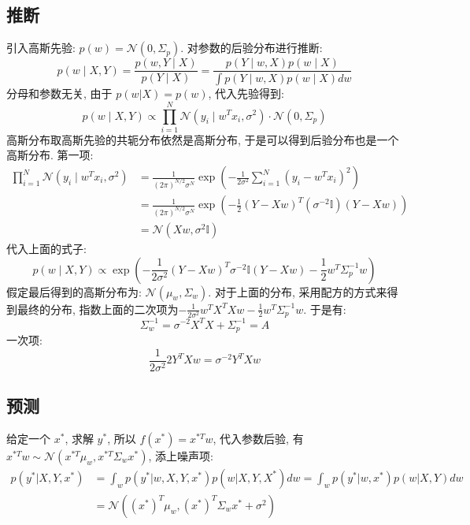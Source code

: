 \subsection{推断}
引入高斯先验: $p(w)=\mathcal{N}(0,\Sigma_p)$. 对参数的后验分布进行推断: 
\begin{equation}
p(w \mid X, Y)=\frac{p(w, Y \mid X)}{p(Y \mid X)}=\frac{p(Y \mid w, X) p(w \mid X)}{\int p(Y \mid w, X) p(w \mid X) d w}
\end{equation}
分母和参数无关, 由于 $p(w|X)=p(w)$, 代入先验得到: 
\begin{equation}
p(w \mid X, Y) \propto \prod_{i=1}^{N} \mathcal{N}\left(y_{i} \mid w^{T} x_{i}, \sigma^{2}\right) \cdot \mathcal{N}\left(0, \Sigma_{p}\right)
\end{equation}
高斯分布取高斯先验的共轭分布依然是高斯分布, 于是可以得到后验分布也是一个高斯分布. 第一项: 
\begin{equation}
\begin{aligned}
\prod_{i=1}^{N} \mathcal{N}\left(y_{i} \mid w^{T} x_{i}, \sigma^{2}\right) & =\frac{1}{(2 \pi)^{N / 2} \sigma^{N}} \exp \left(-\frac{1}{2 \sigma^{2}} \sum_{i=1}^{N}\left(y_{i}-w^{T} x_{i}\right)^{2}\right) \\
& =\frac{1}{(2 \pi)^{N / 2} \sigma^{N}} \exp \left(-\frac{1}{2}(Y-X w)^{T}\left(\sigma^{-2} \mathbb{I}\right)(Y-X w)\right) \\
& =\mathcal{N}\left(X w, \sigma^{2} \mathbb{I}\right)
\end{aligned}
\end{equation}
代入上面的式子:
\begin{equation}
p(w \mid X, Y) \propto \exp \left(-\frac{1}{2 \sigma^{2}}(Y-X w)^{T} \sigma^{-2} \mathbb{I}(Y-X w)-\frac{1}{2} w^{T} \Sigma_{p}^{-1} w\right)
\end{equation}
假定最后得到的高斯分布为: $\mathcal{N}(\mu_w,\Sigma_w)$. 对于上面的分布, 采用配方的方式来得到最终的分布, 指数上面的二次项为$-\frac{1}{2 \sigma^{2}} w^{T} X^{T} X w-\frac{1}{2} w^{T} \Sigma_{p}^{-1} w$. 于是有:
\begin{equation}
\Sigma_{w}^{-1}=\sigma^{-2} X^{T} X+\Sigma_{p}^{-1}=A
\end{equation}
一次项: 
\begin{equation}
\frac{1}{2\sigma ^2}2Y^TXw=\sigma ^{-2}Y^TXw
\end{equation}
\subsection{预测}
给定一个 $x^*$, 求解 $y^*$, 所以 $f(x^*)=x^{*T}w$, 代入参数后验, 有 $x^{*T}w\sim \mathcal{N}(x^{*T}\mu_w,x^{*T}\Sigma_wx^*)$, 添上噪声项:
\begin{equation}
\begin{aligned}
p\left( y^*|X,Y,x^* \right) &=\int_w{p\left( y^*|w,X,Y,x^* \right) p\left( w|X,Y,X^* \right) dw=\int_w{p\left( y^*|w,x^* \right) p\left( w|X,Y \right) dw}} \\
&=\mathcal{N}\left( \left( x^* \right) ^T\mu _w,\left( x^* \right) ^T\varSigma _wx^*+\sigma ^2 \right) 
\end{aligned}
\end{equation}
